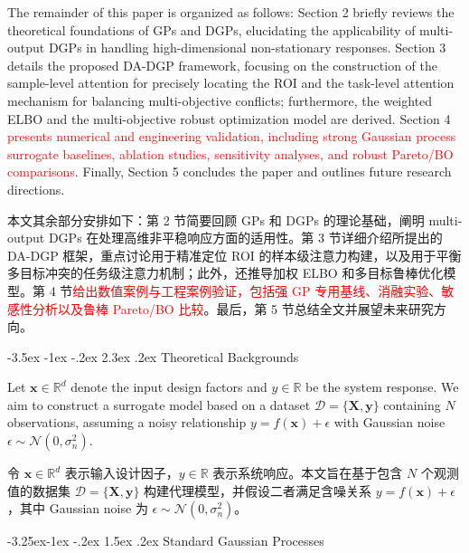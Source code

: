 \documentclass[11pt]{article}
\makeatletter
\renewcommand\section{\@startsection {section}{1}{\z@}%
                                       {-3.5ex \@plus -1ex \@minus -.2ex}%
                                       {2.3ex \@plus.2ex}%
                                       {\normalfont\fontfamily{phv}\fontsize{16}{19}\bfseries}}
\renewcommand\subsection{\@startsection{subsection}{2}{\z@}%
                                         {-3.25ex\@plus -1ex \@minus -.2ex}%
                                         {1.5ex \@plus .2ex}%
                                         {\normalfont\fontfamily{phv}\fontsize{14}{17}\bfseries}}
\makeatother
\begin{document}
The remainder of this paper is organized as follows: Section 2 briefly reviews the theoretical foundations of GPs and DGPs, elucidating the applicability of multi-output DGPs in handling high-dimensional non-stationary responses. Section 3 details the proposed DA-DGP framework, focusing on the construction of the sample-level attention for precisely locating the ROI and the task-level attention mechanism for balancing multi-objective conflicts; furthermore, the weighted ELBO and the multi-objective robust optimization model are derived. Section 4 \textcolor{red}{presents numerical and engineering validation, including strong Gaussian process surrogate baselines, ablation studies, sensitivity analyses, and robust Pareto/BO comparisons}. Finally, Section 5 concludes the paper and outlines future research directions.

本文其余部分安排如下：第 2 节简要回顾 GPs 和 DGPs 的理论基础，阐明 multi-output DGPs 在处理高维非平稳响应方面的适用性。第 3 节详细介绍所提出的 DA-DGP 框架，重点讨论用于精准定位 ROI 的样本级注意力构建，以及用于平衡多目标冲突的任务级注意力机制；此外，还推导加权 ELBO 和多目标鲁棒优化模型。第 4 节\textcolor{red}{给出数值案例与工程案例验证，包括强 GP 专用基线、消融实验、敏感性分析以及鲁棒 Pareto/BO 比较}。最后，第 5 节总结全文并展望未来研究方向。

\section{Theoretical Backgrounds} \label{sec:background}

Let $\mathbf{x} \in \mathbb{R}^d$ denote the input design factors and $y \in \mathbb{R}$ be the system response. We aim to construct a surrogate model based on a dataset $\mathcal{D}=\{\mathbf{X}, \mathbf{y}\}$ containing $N$ observations, assuming a noisy relationship $y = f(\mathbf{x}) + \epsilon$ with Gaussian noise $\epsilon \sim \mathcal{N}(0, \sigma_n^2)$.

令 $\mathbf{x} \in \mathbb{R}^d$ 表示输入设计因子，$y \in \mathbb{R}$ 表示系统响应。本文旨在基于包含 $N$ 个观测值的数据集 $\mathcal{D}=\{\mathbf{X}, \mathbf{y}\}$ 构建代理模型，并假设二者满足含噪关系 $y = f(\mathbf{x}) + \epsilon$，其中 Gaussian noise 为 $\epsilon \sim \mathcal{N}(0, \sigma_n^2)$。

\subsection{Standard Gaussian Processes} \label{subsec:gp}
\end{document}
